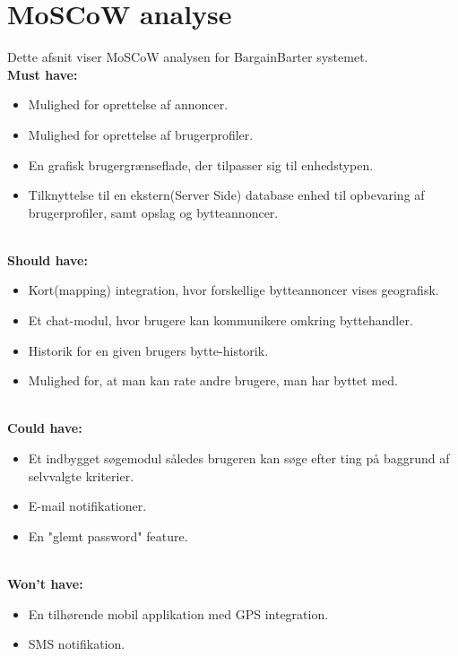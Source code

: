 \chapter{MoSCoW analyse}\label{ch:Moscow}
Dette afsnit viser MoSCoW analysen for BargainBarter systemet. \\
\textbf{Must have:}
\begin{itemize}[noitemsep]
	\item Mulighed for oprettelse af annoncer.
	\item Mulighed for oprettelse af brugerprofiler.
	\item En grafisk brugergrænseflade, der tilpasser sig til enhedstypen.
	\item Tilknyttelse til en ekstern(Server Side) database enhed til opbevaring af brugerprofiler, samt opslag og bytteannoncer.
	
\end{itemize}

\textbf{\\Should have:}
\begin{itemize}[noitemsep]
	\item Kort(mapping) integration, hvor forskellige bytteannoncer vises geografisk.
	\item Et chat-modul, hvor brugere kan kommunikere omkring byttehandler.
	\item Historik for en given brugers bytte-historik.
	\item Mulighed for, at man kan rate andre brugere, man har byttet med.
\end{itemize}

\textbf{\\Could have:}
\begin{itemize}[noitemsep]
	\item Et indbygget søgemodul således brugeren kan søge efter ting på baggrund af selvvalgte kriterier.
	\item E-mail notifikationer.
	\item En "glemt password" feature.
\end{itemize}

\textbf{\\Won't have:}
\begin{itemize}[noitemsep]
	\item En tilhørende mobil applikation med GPS integration.
	\item SMS notifikation.
\end{itemize}
